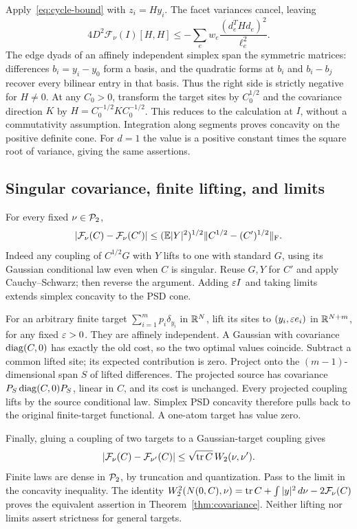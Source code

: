 Apply~\eqref{eq:cycle-bound} with $z_i=Hy_i$. The facet variances cancel,
leaving
\begin{equation}\label{eq:strict-Hessian}
 4D^2\mathcal F_\nu(I)[H,H]
 \leq-\sum_e w_e\frac{(d_e^THd_e)^2}{\ell_e^2}.
\end{equation}
The edge dyads of an affinely independent simplex span the symmetric matrices:
differences $b_i=y_i-y_0$ form a basis, and the quadratic forms at $b_i$
and $b_i-b_j$ recover every bilinear entry in that basis.
Thus the right side is strictly negative for $H\ne0$.
At any $C_0>0$, transform the target sites by $C_0^{1/2}$ and the covariance
direction $K$ by $H=C_0^{-1/2}KC_0^{-1/2}$. This reduces to the calculation
at $I$, without a commutativity assumption. Integration along segments proves
concavity on the positive definite cone. For $d=1$ the value is a positive
constant times the square root of variance, giving the same assertions.

\subsection{Singular covariance, finite lifting, and limits}
For every fixed $\nu\in\mathcal P_2$,
\begin{equation}\label{eq:C-continuity}
 |\mathcal F_\nu(C)-\mathcal F_\nu(C')|
 \leq(\mathbb E|Y|^2)^{1/2}\lVert C^{1/2}-(C')^{1/2}\rVert_{\mathrm F}.
\end{equation}
Indeed any coupling of $C^{1/2}G$ with $Y$ lifts to one with standard $G$,
using its Gaussian conditional law even when $C$ is singular. Reuse $G,Y$
for $C'$ and apply Cauchy--Schwarz; then reverse the argument.
Adding $\varepsilon I$ and taking limits extends simplex concavity to the PSD cone.

For an arbitrary finite target $\sum_{i=1}^m p_i\delta_{y_i}$ in $\mathbb R^N$,
lift its sites to $(y_i,\varepsilon e_i)$ in $\mathbb R^{N+m}$, for any fixed $\varepsilon>0$.
They are affinely independent. A Gaussian with covariance $\operatorname{diag}(C,0)$
has exactly the old cost, so the two optimal values coincide. Subtract a
common lifted site; its expected contribution is zero. Project onto the
$(m-1)$-dimensional span $S$ of lifted differences. The projected source has
covariance $P_S\operatorname{diag}(C,0)P_S$, linear in $C$, and its cost is unchanged.
Every projected coupling lifts by the source conditional law. Simplex PSD
concavity therefore pulls back to the original finite-target functional.
A one-atom target has value zero.

Finally, gluing a coupling of two targets to a Gaussian-target coupling gives
\begin{equation}\label{eq:target-continuity}
 |\mathcal F_\nu(C)-\mathcal F_{\nu'}(C)|
 \leq\sqrt{\operatorname{tr} C}\,W_2(\nu,\nu').
\end{equation}
Finite laws are dense in $\mathcal P_2$, by truncation and quantization. Pass to the
limit in the concavity inequality. The identity
$W_2^2(N(0,C),\nu)=\operatorname{tr} C+\int|y|^2\,d\nu-2\mathcal F_\nu(C)$ proves the
equivalent assertion in Theorem~\ref{thm:covariance}. Neither lifting nor
limits assert strictness for general targets.

